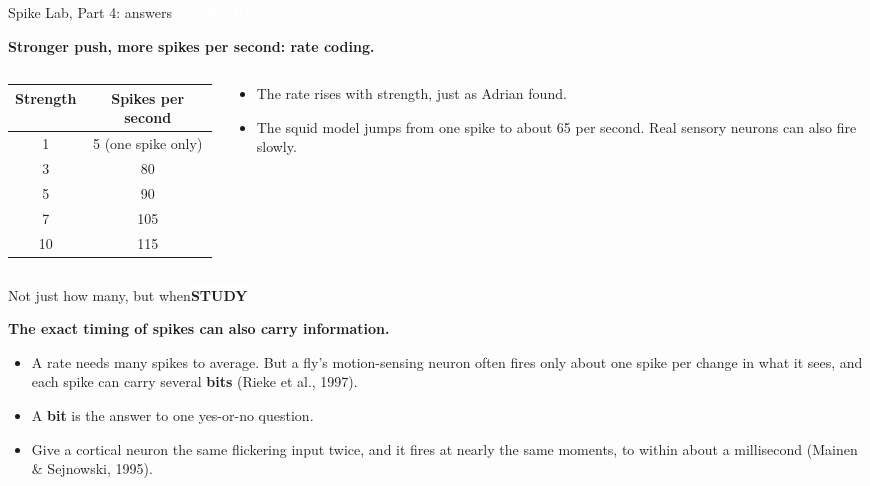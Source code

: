 \documentclass[aspectratio=169,11pt]{beamer}
\newcommand{\tagpill}[3]{{\normalfont\footnotesize\setlength{\fboxsep}{2.5pt}\colorbox{#1}{\textcolor{#2}{\bfseries #3}}}}
\newcommand{\tStudy}{\tagpill{white}{kgreen}{STUDY}}
\newcommand{\tAns}{\tagpill{kgreen}{white}{ANSWERS}}
\newcommand{\src}[1]{{\footnotesize\color{kgrey}(#1)}}
\newcommand{\glance}[1]{%
  \begin{tcolorbox}[enhanced,colback=kpale,colframe=kpale,borderline west={3pt}{0pt}{kaccent},arc=0pt,
    left=8pt,right=6pt,top=3pt,bottom=3pt,halign=flush left,before skip=0pt,after skip=7pt]
    {\large\bfseries\color{kprimary}#1}
  \end{tcolorbox}}
\begin{document}
\begin{frame}{Spike Lab, Part 4: answers}{\tAns}
  \glance{Stronger push, more spikes per second: rate coding.}
  \begin{columns}[c]
    \begin{column}{0.46\textwidth}
      \renewcommand{\arraystretch}{1.3}
      \begin{tabular}{@{}c c@{}}
        \toprule
        Strength & Spikes per second\\
        \midrule
        1 & 5 (one spike only)\\
        3 & 80\\
        5 & 90\\
        7 & 105\\
        10 & 115\\
        \bottomrule
      \end{tabular}
    \end{column}
    \begin{column}{0.52\textwidth}
      \begin{itemize}\setlength{\itemsep}{6pt}
        \item The rate rises with strength, just as Adrian found.
        \item The squid model jumps from one spike to about 65 per second. Real sensory neurons can also fire slowly.
      \end{itemize}
    \end{column}
  \end{columns}
\end{frame}

\begin{frame}{Not just how many, but when}{\tStudy}
  \glance{The exact timing of spikes can also carry information.}
  \begin{itemize}\setlength{\itemsep}{8pt}
    \item A rate needs many spikes to average. But a fly's motion-sensing neuron often fires only about one spike per change in what it sees, and each spike can carry several \textbf{bits} \src{Rieke et al., 1997}.
    \item A \textbf{bit} is the answer to one yes-or-no question.
    \item Give a cortical neuron the same flickering input twice, and it fires at nearly the same moments, to within about a millisecond \src{Mainen \& Sejnowski, 1995}.
  \end{itemize}
\end{frame}
\end{document}
